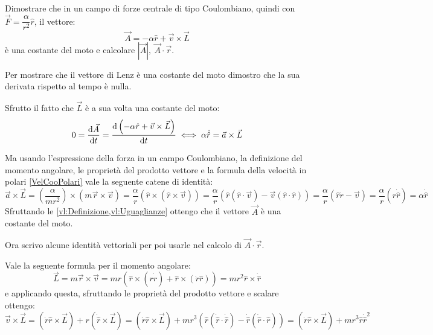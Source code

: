 \documentclass[../main.tex]{subfiles}
\begin{document}

\textex
Dimostrare che in un campo di forze centrale di tipo Coulombiano, quindi con $\vec{F}=\dfrac{\alpha}{r^2}\hat r$, il vettore:
\begin{equation} \label{vl:Definizione}
	\vec{A}=-\alpha \hat r + \vec v\times \vec L
\end{equation}
è una costante del moto e calcolare $|\vec A|,\ \vec{A} \cdot \vec{r}$.


\solution
Per mostrare che il vettore di Lenz è una costante del moto dimostro che la sua derivata rispetto al tempo è nulla.

Sfrutto il fatto che $\vec L$ è a sua volta una costante del moto:
\begin{equation}\label{vl:Derivata}
	0=\frac{\mathrm{d} \vec A}{\mathrm{d} t}=\frac{\mathrm{d} \left(-\alpha\hat r + \vec v\times \vec L\right) }{\mathrm{d} t} \iff \alpha\dot{\hat r} = \vec a\times \vec L
\end{equation}

Ma usando l'espressione della forza in un campo Coulombiano, la definizione del momento angolare, le proprietà del prodotto vettore 
e la formula della velocità in polari \cref{VelCooPolari} vale la seguente catene di identità:
\begin{equation}\label{vl:Uguaglianze}
	\vec a\times \vec L=\left(\dfrac{\alpha}{mr^2}\right)\times\left(m\vec r\times \vec v\right)=\frac{\alpha}{r} \left(\hat r\times \left(\hat r\times \vec v\right)\right)
        =\frac{\alpha}{r} \left(\hat r\left(\hat r \cdot \vec v\right)-\vec v\left(\hat r\cdot \hat r\right)\right)
	=\frac{\alpha}{r} \left(\hat r\dot{r}-\vec v\right)=\frac{\alpha}{r}\left(r\dot{\hat r}\right)=\alpha \dot{\hat r}
\end{equation}
Sfruttando le \cref{vl:Definizione,vl:Uguaglianze} ottengo che il vettore $\vec A$ è una costante del moto.

Ora scrivo alcune identità vettoriali per poi usarle nel calcolo di $\vec A\cdot \vec r$.

Vale la seguente formula per il momento angolare:
\begin{equation*}
	\vec L=m\vec r\times \vec v=mr\left(\hat r\times (r\dot{ \hat r })+\hat r\times(\dot r \hat r)\right)
	= mr^2\hat r\times\dot{\hat r}
\end{equation*}
e applicando questa, sfruttando le proprietà del prodotto vettore e scalare ottengo:
\begin{equation}\label{vl:VperL}
	\vec v\times \vec L=(\dot r \hat r \times \vec L)+r\left(\dot{\hat r}\times \vec L\right)
	=(\dot r \hat r \times \vec L)+mr^3\left(\hat r(\dot{\hat r}\cdot \dot{\hat r})-\dot{\hat r}(\dot{\hat r}\cdot \hat r) \right)
	=(\dot r \hat r \times \vec L)+mr^3 \hat r \dot{\hat r}^2
\end{equation}
\end{document}
